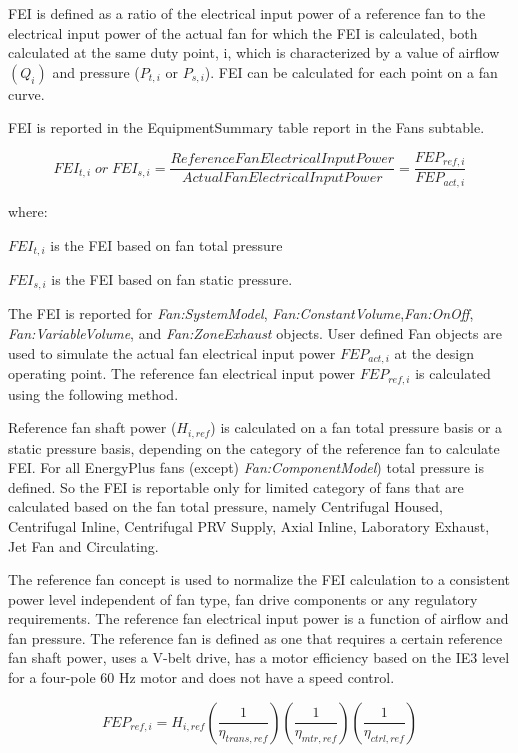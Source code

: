 FEI is defined as a ratio of the electrical input power of a reference fan to the electrical input power of the actual fan for which the FEI is calculated, both calculated at the same duty point, i, which is characterized by a value of airflow \((Q_i)\) and pressure (\(P_{t,i}\) or \(P_{s,i}\)). FEI can be calculated for each point on a fan curve.

FEI is reported in the EquipmentSummary table report in the Fans subtable.

\begin{equation}
FEI_{t,i}\;or\;FEI_{s,i}=\frac{Reference Fan Electrical Input Power}{Actual Fan Electrical Input Power} = \frac{FEP_{ref,i}}{FEP_{act,i}}
\label{eq:fei_calculation}
\end{equation}

where:

\(FEI_{t,i}\) is the FEI based on fan total pressure

\(FEI_{s,i}\) is the FEI based on fan static pressure.

The FEI is reported for \emph{Fan:SystemModel}, \emph{Fan:ConstantVolume},\emph{Fan:OnOff}, \emph{Fan:VariableVolume}, and \emph{Fan:ZoneExhaust} objects. User defined Fan objects are used to simulate the actual fan electrical input power \(FEP_{act,i}\) at the design operating point. The reference fan electrical input power \(FEP_{ref,i}\) is calculated using the following method.

Reference fan shaft power (\(H_{i,ref}\)) is calculated on a fan total pressure basis or a static pressure basis, depending on the category of the reference fan to calculate FEI. For all EnergyPlus fans (except) \emph{Fan:ComponentModel}) total pressure is defined. So the FEI is reportable only for limited category of fans that are calculated based on the fan total pressure, namely Centrifugal Housed, Centrifugal Inline, Centrifugal PRV Supply, Axial Inline, Laboratory Exhaust, Jet Fan and Circulating. 

The reference fan concept is used to normalize the FEI calculation to a consistent power level independent of fan type, fan drive components or any regulatory requirements. The reference fan electrical input power is a function of airflow and fan pressure. The reference fan is defined as one that requires a certain reference fan shaft power, uses a V-belt drive, has a motor efficiency based on the IE3 level for a four-pole 60 Hz motor and does not have a speed control.

\begin{equation}
FEP_{ref,i}=H_{i,ref}(\frac{1}{\eta_{trans,ref}} )(\frac{1}{\eta_{mtr,ref}})(\frac{1}{\eta_{ctrl,ref}}) 
\label{eq:fep_calculation}
\end{equation}


